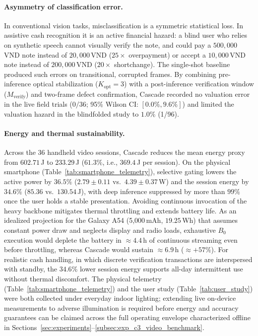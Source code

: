 \documentclass[final,5p,times,twocolumn,authoryear]{elsarticle}
\begin{document}
\paragraph{Asymmetry of classification error.}
In conventional vision tasks, misclassification is a symmetric statistical loss. In assistive cash recognition it is an active financial hazard: a blind user who relies on synthetic speech cannot visually verify the note, and could pay a $500{,}000$\,VND note instead of $20{,}000$\,VND ($25\times$ overpayment) or accept a $10{,}000$\,VND note instead of $200{,}000$\,VND ($20\times$ shortchange). The single-shot baseline produced such errors on transitional, corrupted frames. By combining pre-inference optical stabilization ($K_{\text{opt}} = 3$) with a post-inference verification window ($M_{\text{verify}}$) and two-frame defect confirmation, Cascade recorded no valuation error in the live field trials ($0/36$; 95\% Wilson CI: $[0.0\%, 9.6\%]$) and limited the valuation hazard in the blindfolded study to $1.0\%$ (1/96).

\paragraph{Energy and thermal sustainability.}
Across the 36 handheld video sessions, Cascade reduces the mean energy proxy from $602.71$\,J to $233.29$\,J ($61.3\%$, i.e., $369.4$\,J per session). On the physical smartphone (Table~\ref{tab:smartphone_telemetry}), selective gating lowers the active power by $36.5\%$ ($2.79 \pm 0.11$ vs.\ $4.39 \pm 0.37$\,W) and the session energy by $34.6\%$ ($85.36$ vs.\ $130.54$\,J), with deep inference suppressed by more than $99\%$ once the user holds a stable presentation. Avoiding continuous invocation of the heavy backbone mitigates thermal throttling and extends battery life. As an idealized projection for the Galaxy A54 (5{,}000\,mAh, $19.25$\,Wh) that assumes constant power draw and neglects display and radio loads, exhaustive $B_0$ execution would deplete the battery in $\approx 4.4$\,h of continuous streaming even before throttling, whereas Cascade would sustain $\approx 6.9$\,h ($\approx +57\%$). For realistic cash handling, in which discrete verification transactions are interspersed with standby, the $34.6\%$ lower session energy supports all-day intermittent use without thermal discomfort. The physical telemetry (Table~\ref{tab:smartphone_telemetry}) and the user study (Table~\ref{tab:user_study}) were both collected under everyday indoor lighting; extending live on-device measurements to adverse illumination is required before energy and accuracy guarantees can be claimed across the full operating envelope characterized offline in Sections~\ref{sec:experiments}--\ref{subsec:exp_c3_video_benchmark}.
\end{document}
